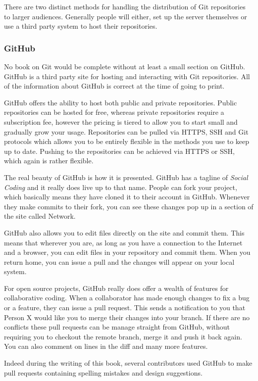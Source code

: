 There are two distinct methods for handling the distribution of Git repositories to larger audiences.
Generally people will either, set up the server themselves or use a third party system to host their repositories.

\subsubsection{GitHub}
No book on Git would be complete without at least a small section on GitHub.
GitHub is a third party site for hosting and interacting with Git repositories.
All of the information about GitHub is correct at the time of going to print.

GitHub offers the ability to host both public and private repositories.
Public repositories can be hosted for free, whereas private repositories require a subscription fee, however the pricing is tiered to allow you to start small and gradually grow your usage.
Repositories can be pulled via HTTPS, SSH and Git protocols which allows you to be entirely flexible in the methods you use to keep up to date.
Pushing to the repositories can be achieved via HTTPS or SSH, which again is rather flexible.

The real beauty of GitHub is how it is presented.
GitHub has a tagline of \emph{Social Coding} and it really does live up to that name.
People can fork your project, which basically means they have cloned it to their account in GitHub.
Whenever they make commits to their fork, you can see these changes pop up in a section of the site called Network.

GitHub also allows you to edit files directly on the site and commit them.
This means that wherever you are, as long as you have a connection to the Internet and a browser, you can edit files in your repository and commit them.
When you return home, you can issue a pull and the changes will appear on your local system.

For open source projects, GitHub really does offer a wealth of features for collaborative coding.
When a collaborator has made enough changes to fix a bug or a feature, they can issue a pull request.
This sends a notification to you that Person X would like you to merge their changes into your branch.
If there are no conflicts these pull requests can be manage straight from GitHub, without requiring you to checkout the remote branch, merge it and push it back again.
You can also comment on lines in the diff and many more features.

Indeed during the writing of this book, several contributors used GitHub to make pull requests containing spelling mistakes and design suggestions.

